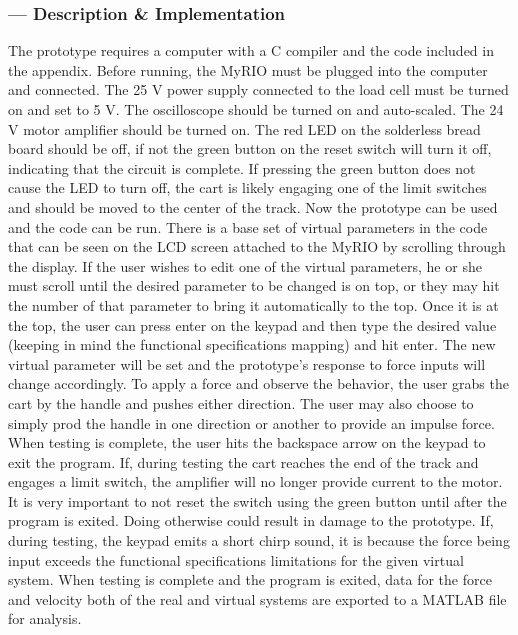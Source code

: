 \subsubsection*{ --- Description \& Implementation}
The prototype requires a computer with a C compiler and the code included in the appendix. Before running, the MyRIO must be plugged into the computer and connected. The 25 V power supply connected to the load cell must be turned on and set to 5 V. The oscilloscope should be turned on and auto-scaled. The 24 V motor amplifier should be turned on. The red LED on the solderless bread board should be off, if not the green button on the reset switch will turn it off, indicating that the circuit is complete. If pressing the green button does not cause the LED to turn off, the cart is likely engaging one of the limit switches and should be moved to the center of the track. 
Now the prototype can be used and the code can be run. There is a base set of virtual parameters in the code that can be seen on the LCD screen attached to the MyRIO by scrolling through the display. If the user wishes to edit one of the virtual parameters, he or she must scroll until the desired parameter to be changed is on top, or they may hit the number of that parameter to bring it automatically to the top. Once it is at the top, the user can press enter on the keypad and then type the desired value (keeping in mind the functional specifications mapping) and hit enter. The new virtual parameter will be set and the prototype's response to force inputs will change accordingly. 
To apply a force and observe the behavior, the user grabs the cart by the handle and pushes either direction. The user may also choose to simply prod the handle in one direction or another to provide an impulse force. 
When testing is complete, the user hits the backspace arrow on the keypad to exit the program. If, during testing the cart reaches the end of the track and engages a limit switch, the amplifier will no longer provide current to the motor. It is very important to not reset the switch using the green button until after the program is exited. Doing otherwise could result in damage to the prototype. If, during testing, the keypad emits a short chirp sound, it is because the force being input exceeds the functional specifications limitations for the given virtual system. When testing is complete and the program is exited, data for the force and velocity both of the real and virtual systems are exported to a MATLAB file for analysis.